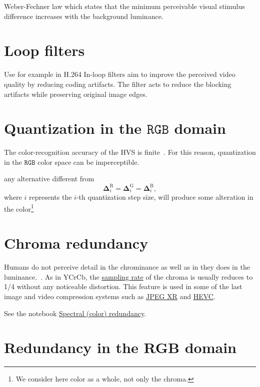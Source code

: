 Weber-Fechner law which states
that the minimum perceivable visual stimulus difference increases with the background luminance.

\section{Loop filters}
Use for example in H.264 In-loop filters aim to improve the perceived
video quality by reducing coding artifacts. The filter acts to reduce
the blocking artifacts while preserving original image edges.


\section{Quantization in the $\texttt{RGB}$ domain}

The color-recognition accuracy of the HVS is
finite~\cite{vruiz__visual_redundancy}. For this reason, quantization
in the $\texttt{RGB}$ color space can be imperceptible.

any alternative different from
\begin{equation}
  \mathbf{\Delta}^{\text{R}}_i = \mathbf{\Delta}^{\text{G}}_i =
  \mathbf{\Delta}^{\text{B}}_i,
  \label{eq:simple_Q}
\end{equation}
where $i$ represents the $i$-th quantization step size, will produce
some alteration in the color\footnote{We consider here color as a
whole, not only the chroma.}

\section{Chroma redundancy}

Humans do not perceive detail in the chrominance as well as in they
does in the
luminance.~\cite{burger2016digital}. As in
$\text{YCrCb}$, the
\href{https://en.wikipedia.org/wiki/Sampling_(signal_processing)}{sampling
  rate} of the chroma is usually reduces to 1/4 without any noticeable
distortion. This feature is used in some of the last image and video
compression systems such as
\href{https://en.wikipedia.org/wiki/JPEG_XR#Description}{JPEG XR} and
\href{https://en.wikipedia.org/wiki/High_Efficiency_Video_Coding#Video_coding_layer}{HEVC}.

See the notebook
\href{https://github.com/vicente-gonzalez-ruiz/color_transforms/blob/main/docs/color_redundancy.ipynb}{Spectral
  (color) redundancy}.

\section{Redundancy in the RGB domain}

